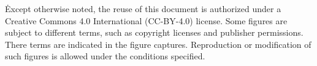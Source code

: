 \usepackage[type={CC}, modifier={by}, version={4.0}]{doclicense-di}

{%
  \copyrighttext%
  {\copyrightstring\. Except otherwise noted, the reuse of this
    document is authorized under a Creative Commons 4.0 International
  (CC-BY-4.0) license.}%
  {%
    \copyrightstring
    \doclicenseThis
    \blockpar
    Some figures are subject to different terms, such as copyright
    licenses and publisher permissions. There terms are indicated in
    the figure captures. Reproduction or modification of such figures
    is allowed under the conditions specified.
  }
}
